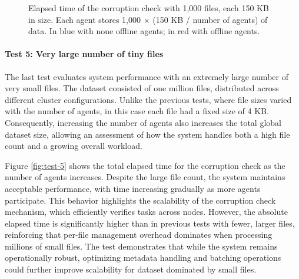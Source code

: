 \begin{figure}[!ht]
\centering
{}
\caption{Elapsed time of the corruption check with 1,000 files, each 150 KB in
    size. Each agent stores 1,000 $\times$ (150 KB / number of agents) of data. In blue with none offline agents; in red with offline
    agents.}
\label{fig:test-4}
\end{figure}

\newpage
\paragraph{Test 5: Very large number of tiny files}

The last test evaluates system performance with an extremely large number of very small files. The dataset consisted of one million files, distributed across different cluster configurations. Unlike the previous tests, where file sizes varied with the number of agents, in this case each file had a fixed size of 4 KB. Consequently, increasing the number of agents also increases the total global dataset size, allowing an assessment of how the system handles both a high file count and a growing overall workload.

Figure \ref{fig:test-5} shows the total elapsed time for the corruption check as
the number of agents increases. Despite the large file count, the system
maintains acceptable performance, with time increasing gradually as more agents
participate. This behavior highlights the scalability of the corruption check
mechanism, which efficiently verifies tasks across nodes. However, the absolute
elapsed time is significantly higher than in previous tests with fewer, larger
files, reinforcing that per-file management overhead dominates when processing
millions of small files. The test demonstrates that while the system remains
operationally robust, optimizing metadata handling and batching operations could
further improve scalability for dataset dominated by small files.

